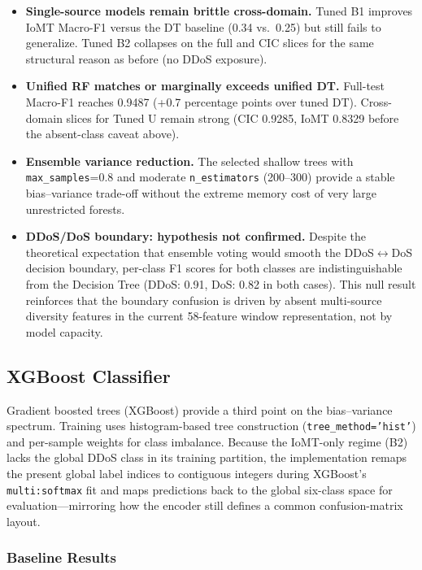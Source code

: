 \begin{itemize}[nosep]
  \item \textbf{Single-source models remain brittle cross-domain.} Tuned B1 improves IoMT Macro-F1 versus the DT baseline (0.34 vs.\ 0.25) but still fails to generalize. Tuned B2 collapses on the full and CIC slices for the same structural reason as before (no DDoS exposure).
  \item \textbf{Unified RF matches or marginally exceeds unified DT.} Full-test Macro-F1 reaches 0.9487 (+0.7 percentage points over tuned DT). Cross-domain slices for Tuned U remain strong (CIC 0.9285, IoMT 0.8329 before the absent-class caveat above).
  \item \textbf{Ensemble variance reduction.} The selected shallow trees with \texttt{max\_samples}=0.8 and moderate \texttt{n\_estimators} (200--300) provide a stable bias--variance trade-off without the extreme memory cost of very large unrestricted forests.
  \item \textbf{DDoS/DoS boundary: hypothesis not confirmed.} Despite the theoretical expectation that ensemble voting would smooth the DDoS$\leftrightarrow$DoS decision boundary, per-class F1 scores for both classes are indistinguishable from the Decision Tree (DDoS: 0.91, DoS: 0.82 in both cases). This null result reinforces that the boundary confusion is driven by absent multi-source diversity features in the current 58-feature window representation, not by model capacity.
\end{itemize}

\subsection{XGBoost Classifier}
\label{subsec:xgboost}

Gradient boosted trees (XGBoost) provide a third point on the bias--variance spectrum. Training uses histogram-based tree construction (\texttt{tree\_method='hist'}) and per-sample weights for class imbalance. Because the IoMT-only regime (B2) lacks the global DDoS class in its training partition, the implementation remaps the present global label indices to contiguous integers during XGBoost's \texttt{multi:softmax} fit and maps predictions back to the global six-class space for evaluation---mirroring how the encoder still defines a common confusion-matrix layout.

\subsubsection{Baseline Results}

